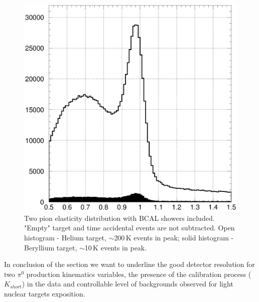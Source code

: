 \begin{figure}[!h]
\centering\includegraphics[width=4.5in]{figures/elast_2pi0_hevsbe.eps}
\caption{Two pion elasticity distribution with BCAL showers included. "Empty" target and time accidental events are not subtracted. Open histogram - Helium target, $\sim$200$\,$K events in peak; solid histogram - Beryllium target, $\sim$10$\,$K events in peak.
\label{fig:beheelast}}
\end{figure}


In conclusion of the section we want to underline the good detector resolution for two $\pi^0$ production kinematics variables, the presence of the calibration process ($K_{short}$) in the data and controllable level of backgrounds observed for light nuclear targets exposition.